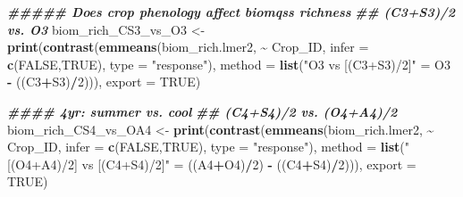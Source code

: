 \documentclass[
]{article}
\newenvironment{Shaded}{\begin{snugshade}}{\end{snugshade}}
\newcommand{\AttributeTok}[1]{\textcolor[rgb]{0.13,0.29,0.53}{#1}}
\newcommand{\ConstantTok}[1]{\textcolor[rgb]{0.56,0.35,0.01}{#1}}
\newcommand{\DecValTok}[1]{\textcolor[rgb]{0.00,0.00,0.81}{#1}}
\newcommand{\DocumentationTok}[1]{\textcolor[rgb]{0.56,0.35,0.01}{\textbf{\textit{#1}}}}
\newcommand{\FunctionTok}[1]{\textcolor[rgb]{0.13,0.29,0.53}{\textbf{#1}}}
\newcommand{\NormalTok}[1]{#1}
\newcommand{\OtherTok}[1]{\textcolor[rgb]{0.56,0.35,0.01}{#1}}
\newcommand{\SpecialCharTok}[1]{\textcolor[rgb]{0.81,0.36,0.00}{\textbf{#1}}}
\newcommand{\StringTok}[1]{\textcolor[rgb]{0.31,0.60,0.02}{#1}}
\begin{document}
\begin{Shaded}
\begin{Highlighting}[]
\DocumentationTok{\#\#\#\#\# Does crop phenology affect biomqss richness }
\DocumentationTok{\#\# (C3+S3)/2 vs. O3}
\NormalTok{biom\_rich\_CS3\_vs\_O3 }\OtherTok{\textless{}{-}} \FunctionTok{print}\NormalTok{(}\FunctionTok{contrast}\NormalTok{(}\FunctionTok{emmeans}\NormalTok{(biom\_rich.lmer2, }\SpecialCharTok{\textasciitilde{}}\NormalTok{ Crop\_ID,}
                                              \AttributeTok{infer =} \FunctionTok{c}\NormalTok{(}\ConstantTok{FALSE}\NormalTok{,}\ConstantTok{TRUE}\NormalTok{), }
                                              \AttributeTok{type =} \StringTok{"response"}\NormalTok{),}
                                      \AttributeTok{method =} \FunctionTok{list}\NormalTok{(}\StringTok{"O3 vs [(C3+S3)/2]"} \OtherTok{=}\NormalTok{ O3 }\SpecialCharTok{{-}}\NormalTok{ ((C3}\SpecialCharTok{+}\NormalTok{S3)}\SpecialCharTok{/}\DecValTok{2}\NormalTok{))),}
                             \AttributeTok{export =} \ConstantTok{TRUE}\NormalTok{)}

\DocumentationTok{\#\#\#\# 4yr: summer vs. cool}
\DocumentationTok{\#\# (C4+S4)/2 vs. (O4+A4)/2 }
\NormalTok{biom\_rich\_CS4\_vs\_OA4 }\OtherTok{\textless{}{-}} \FunctionTok{print}\NormalTok{(}\FunctionTok{contrast}\NormalTok{(}\FunctionTok{emmeans}\NormalTok{(biom\_rich.lmer2, }\SpecialCharTok{\textasciitilde{}}\NormalTok{ Crop\_ID,}
                                               \AttributeTok{infer =} \FunctionTok{c}\NormalTok{(}\ConstantTok{FALSE}\NormalTok{,}\ConstantTok{TRUE}\NormalTok{),}
                                               \AttributeTok{type =} \StringTok{"response"}\NormalTok{),}
                                       \AttributeTok{method =} \FunctionTok{list}\NormalTok{(}\StringTok{"[(O4+A4)/2] vs [(C4+S4)/2]"} \OtherTok{=}
\NormalTok{                                                       ((A4}\SpecialCharTok{+}\NormalTok{O4)}\SpecialCharTok{/}\DecValTok{2}\NormalTok{) }\SpecialCharTok{{-}}\NormalTok{ ((C4}\SpecialCharTok{+}\NormalTok{S4)}\SpecialCharTok{/}\DecValTok{2}\NormalTok{))),}
                              \AttributeTok{export =} \ConstantTok{TRUE}\NormalTok{)}


\end{Highlighting}
\end{Shaded}
\end{document}
